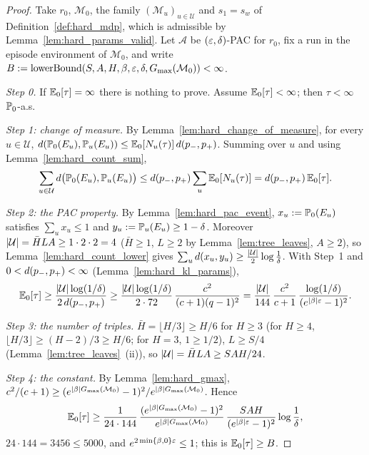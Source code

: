 \begin{proof}
\leanok
{}
Take $r_0$, $\mathcal M_0$, the family $(\mathcal M_u)_{u \in \mathcal U}$ and $s_1 = s_w$ of
Definition~\ref{def:hard_mdp}, which is admissible by Lemma~\ref{lem:hard_params_valid}. Let
$\mathcal A$ be $(\varepsilon,\delta)$-PAC for $r_0$, fix a run in the episode environment of
$\mathcal M_0$, and write $B := \mathrm{lowerBound}(S,A,H,\beta,\varepsilon,\delta,G_{\max}(\mathcal M_0)) < \infty$.

\emph{Step 0.} If $\mathbb{E}_0[\tau] = \infty$ there is nothing to prove. Assume $\mathbb{E}_0[\tau] < \infty$;
then $\tau < \infty$ $\mathbb{P}_0$-a.s.

\emph{Step 1: change of measure.} By Lemma~\ref{lem:hard_change_of_measure}, for every
$u \in \mathcal U$, $d(\mathbb{P}_0(E_u), \mathbb{P}_u(E_u)) \le \mathbb{E}_0[N_u(\tau)]\,d(p_-,p_+)$. Summing
over $u$ and using Lemma~\ref{lem:hard_count_sum},
\[
  \sum_{u \in \mathcal U}d\big(\mathbb{P}_0(E_u), \mathbb{P}_u(E_u)\big) \le d(p_-,p_+)\sum_{u}\mathbb{E}_0[N_u(\tau)] = d(p_-,p_+)\,\mathbb{E}_0[\tau] .
\]

\emph{Step 2: the PAC property.} By Lemma~\ref{lem:hard_pac_event}, $x_u := \mathbb{P}_0(E_u)$
satisfies $\sum_u x_u \le 1$ and $y_u := \mathbb{P}_u(E_u) \ge 1 - \delta$. Moreover
$\lvert \mathcal U \rvert = \bar H L A \ge 1\cdot 2\cdot 2 = 4$ ($\bar H \ge 1$, $L \ge 2$ by
Lemma~\ref{lem:tree_leaves}, $A \ge 2$), so Lemma~\ref{lem:hard_count_lower} gives
$\sum_u d(x_u, y_u) \ge \frac{\lvert \mathcal U \rvert}{2}\log\frac1\delta$. With Step~1 and
$0 < d(p_-,p_+) < \infty$ (Lemma~\ref{lem:hard_kl_params}),
\[
  \mathbb{E}_0[\tau] \ge \frac{\lvert \mathcal U \rvert\log(1/\delta)}{2\,d(p_-,p_+)} \ge \frac{\lvert \mathcal U \rvert\log(1/\delta)}{2\cdot 72}\,\frac{c^2}{(c+1)(q-1)^2}
  = \frac{\lvert \mathcal U \rvert}{144}\,\frac{c^2}{c+1}\,\frac{\log(1/\delta)}{(e^{|\beta|\varepsilon}-1)^2} .
\]

\emph{Step 3: the number of triples.} $\bar H = \lfloor H/3 \rfloor \ge H/6$ for $H \ge 3$ (for
$H \ge 4$, $\lfloor H/3\rfloor \ge (H-2)/3 \ge H/6$; for $H = 3$, $1 \ge 1/2$), $L \ge S/4$
(Lemma~\ref{lem:tree_leaves}~(ii)), so $\lvert \mathcal U \rvert = \bar H L A \ge SAH/24$.

\emph{Step 4: the constant.} By Lemma~\ref{lem:hard_gmax},
$c^2/(c+1) \ge (e^{|\beta|G_{\max}(\mathcal M_0)}-1)^2/e^{|\beta|G_{\max}(\mathcal M_0)}$. Hence
\[
  \mathbb{E}_0[\tau] \ge \frac{1}{24\cdot 144}\,\frac{(e^{|\beta|G_{\max}(\mathcal M_0)}-1)^2}{e^{|\beta|G_{\max}(\mathcal M_0)}}\,\frac{SAH}{(e^{|\beta|\varepsilon}-1)^2}\log\frac1\delta ,
\]
$24 \cdot 144 = 3456 \le 5000$, and $e^{2\min\{\beta,0\}\varepsilon} \le 1$; this is $\mathbb{E}_0[\tau] \ge B$.
\end{proof}

